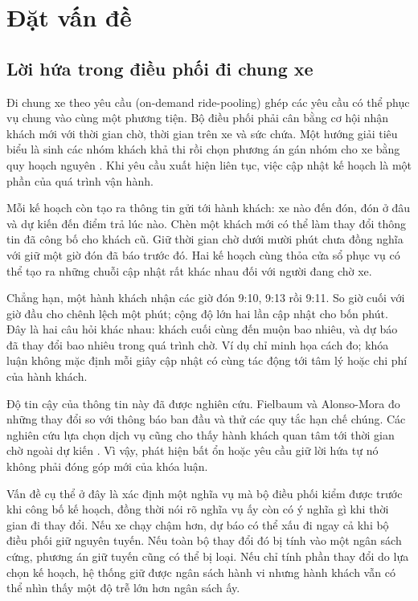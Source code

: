 ﻿\chapter{Đặt vấn đề}

\section{Lời hứa trong điều phối đi chung xe}

Đi chung xe theo yêu cầu (on-demand ride-pooling) ghép các yêu cầu có thể phục vụ chung vào
cùng một phương tiện. Bộ điều phối phải cân bằng cơ hội nhận khách mới với thời gian chờ,
thời gian trên xe và sức chứa. Một hướng giải tiêu biểu là sinh các nhóm khách khả thi rồi
chọn phương án gán nhóm cho xe bằng quy hoạch nguyên \cite{alonsomora2017}. Khi yêu cầu xuất
hiện liên tục, việc cập nhật kế hoạch là một phần của quá trình vận hành.

Mỗi kế hoạch còn tạo ra thông tin gửi tới hành khách: xe nào đến đón, đón ở đâu và dự kiến
đến điểm trả lúc nào. Chèn một khách mới có thể làm thay đổi thông tin đã công bố cho khách
cũ. Giữ thời gian chờ dưới mười phút chưa đồng nghĩa với giữ một giờ đón đã báo trước đó.
Hai kế hoạch cùng thỏa cửa sổ phục vụ có thể tạo ra những chuỗi cập nhật rất khác nhau đối
với người đang chờ xe.

Chẳng hạn, một hành khách nhận các giờ đón 9:10, 9:13 rồi 9:11. So giờ cuối với giờ đầu cho
chênh lệch một phút; cộng độ lớn hai lần cập nhật cho bốn phút. Đây là hai câu hỏi khác nhau:
khách cuối cùng đến muộn bao nhiêu, và dự báo đã thay đổi bao nhiêu trong quá trình chờ.
Ví dụ chỉ minh họa cách đo; khóa luận không mặc định mỗi giây cập nhật có cùng tác động tới
tâm lý hoặc chi phí của hành khách.

Độ tin cậy của thông tin này đã được nghiên cứu. Fielbaum và Alonso-Mora
\cite{fielbaum2020} đo những thay đổi so với thông báo ban đầu và thử các quy tắc hạn chế
chúng. Các nghiên cứu lựa chọn dịch vụ cũng cho thấy hành khách quan tâm tới thời gian chờ
ngoài dự kiến \cite{alonsogonzalez2020,gerzinic2023}. Vì vậy, phát hiện bất ổn hoặc yêu cầu
giữ lời hứa tự nó không phải đóng góp mới của khóa luận.

Vấn đề cụ thể ở đây là xác định một nghĩa vụ mà bộ điều phối kiểm được trước khi công bố
kế hoạch, đồng thời nói rõ nghĩa vụ ấy còn có ý nghĩa gì khi thời gian đi thay đổi. Nếu xe
chạy chậm hơn, dự báo có thể xấu đi ngay cả khi bộ điều phối giữ nguyên tuyến. Nếu toàn bộ
thay đổi đó bị tính vào một ngân sách cứng, phương án giữ tuyến cũng có thể bị loại. Nếu chỉ
tính phần thay đổi do lựa chọn kế hoạch, hệ thống giữ được ngân sách hành vi nhưng hành
khách vẫn có thể nhìn thấy một độ trễ lớn hơn ngân sách ấy.

